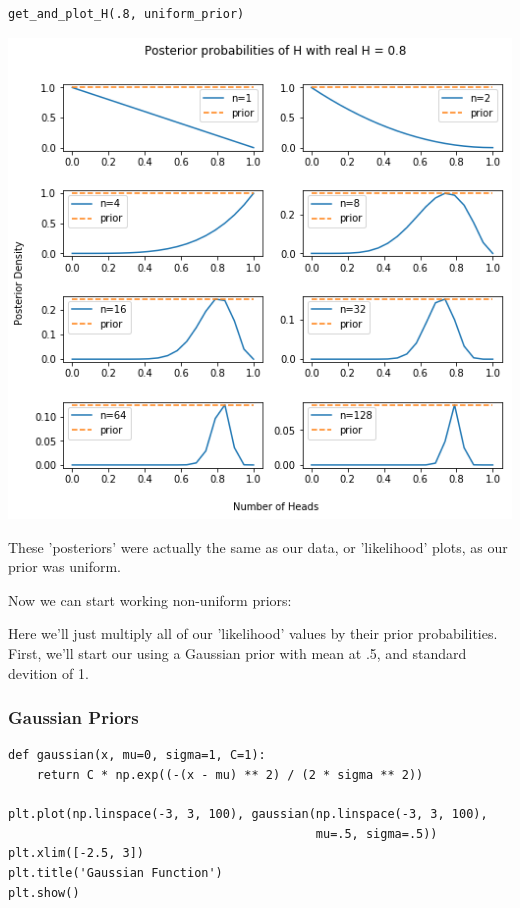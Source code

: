 \documentclass[11pt]{article}
\begin{document}
\begin{verbatim}
get_and_plot_H(.8, uniform_prior)
\end{verbatim}

\includegraphics[width=.9\linewidth]{./obipy-resources/322Rfe.png}

These 'posteriors' were actually the same as our data, or 'likelihood' plots,
as our prior was uniform.

Now we can start working non-uniform priors:

Here we'll just multiply all of our 'likelihood' values by their prior
probabilities. First, we'll start our using a Gaussian prior with mean at .5,
and standard devition of 1.

\subsubsection*{Gaussian Priors}
\label{sec-1-4-2}

\begin{verbatim}
def gaussian(x, mu=0, sigma=1, C=1):
    return C * np.exp((-(x - mu) ** 2) / (2 * sigma ** 2))

plt.plot(np.linspace(-3, 3, 100), gaussian(np.linspace(-3, 3, 100),
                                           mu=.5, sigma=.5))
plt.xlim([-2.5, 3])
plt.title('Gaussian Function')
plt.show()
\end{verbatim}
\end{document}
